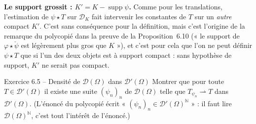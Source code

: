 \documentclass[11pt,a4paper]{article}
\newcommand{\N}{\mathbb{N}}
\DeclareMathOperator{\supp}{supp}
\newcommand{\D}{\mathcal{D}}
\theoremstyle{definition}
\begin{document}
\begin{piege}
\textbf{Le support grossit : $K'=K-\supp\psi$.} Comme pour les translations, l'estimation de $\psi\star T$ sur $\D_K$ fait intervenir les constantes de $T$ sur un \emph{autre} compact $K'$. C'est sans conséquence pour la définition, mais c'est l'origine de la remarque du polycopié dans la preuve de la Proposition~6.10 (« le support de $\varphi\star\check\psi$ est légèrement plus gros que $K$ »), et c'est pour cela que l'on ne peut définir $\psi\star T$ que si l'un des deux objets est à support compact : sans hypothèse de support, $K'$ ne serait pas compact.
\end{piege}

\begin{exo}{Exercice 6.5 -- Densité de $\D(\Omega)$ dans $\D'(\Omega)$}
Montrer que pour toute $T\in\D'(\Omega)$ il existe une suite $(\psi_n)_n$ de $\D(\Omega)$ telle que $T_{\psi_n}\rightharpoonup T$ dans $\D'(\Omega)$. (L'énoncé du polycopié écrit « $(\psi_n)_n\in\D'(\Omega)^\N$ » : il faut lire $\D(\Omega)^\N$, c'est tout l'intérêt de l'énoncé.)
\end{exo}
\end{document}
